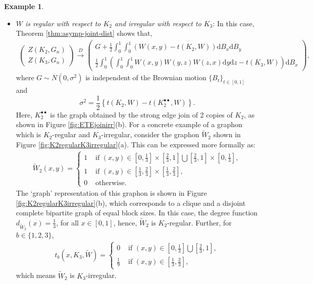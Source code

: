 \documentclass[11pt,reqno]{amsart}
\numberwithin{equation}{section}
\theoremstyle{definition}
\newtheorem{example}{Example}[section]
\begin{document}
\begin{example}
\begin{itemize}
\item[{\it Case} 2:] {\it $W$ is regular with respect to $K_2$ and  irregular with respect to $K_3$}: In this case, Theorem \ref{thm:asymp-joint-dist} shows that,
    \begin{align*}  
        \begin{pmatrix} 
        Z(K_2, G_n) \\ 
        Z(K_3, G_n)
        \end{pmatrix}
         \stackrel{D} \rightarrow \begin{pmatrix}
            G + \frac{1}{2} \int_{0}^{1}\int_{0}^{1} \left(W(x,y) - t(K_2,W)\right) \mathrm d B_{x}\mathrm d B_{y}\\
            \frac{1}{2}\int_{0}^{1}\left(\int_0^1\int_0^1W(x,y)W(y,z)W(z,x)\mathrm d y\mathrm d z - t(K_3,W)\right)\mathrm d B_{x}
        \end{pmatrix} , 
        \end{align*}
        where $G\sim N(0,\sigma^2)$ is independent of the Brownian motion $\{B_{t}\}_{t\in [0,1]}$ and
        $$\sigma^2 = \frac{1}{2}\left\{t\left(K_2,W\right) - t\left(K_2^{\bullet \bullet},W\right)\right\} . $$ 
        Here, $K_2^{\bullet \bullet}$ is the graph obtained by the strong edge join of 2 copies of $K_2$, as shown in Figure \ref{fig:ETEjoinirr}(b). For a concrete example of a graphon which is $K_2$-regular and $K_3$-irregular, consider the graphon $\tilde{W}_2$ shown in Figure \ref{fig:K2regularK3irregular}(a). This can be expressed more formally as: 
    \begin{align}\label{eq:K2regular}
        \tilde{W}_2(x, y)=
            \begin{cases}
            1 & \text{ if }(x,y)\in \left[0, \frac{1}{3}\right] \times  \left[\frac{2}{3}, 1 \right] \bigcup  \left[\frac{2}{3}, 1\right] \times  \left[0, \frac{1}{3} \right] , \\
            1 & \text{ if }(x,y)\in \left[\frac{1}{3}, \frac{2}{3}\right] \times  \left[\frac{1}{3}, \frac{2}{3}\right]   , \\ 
            0 & \text{ otherwise} .
            \end{cases}
    \end{align}
        The `graph' representation of this graphon is shown in Figure \ref{fig:K2regularK3irregular}(b), which corresponds to a clique and a disjoint complete bipartite graph of equal block sizes. In this case, the degree function $d_{\tilde{W}_2}(x) = \frac{1}{3}$, for all $x \in [0, 1]$, hence, $\tilde{W}_2$ is $K_2$-regular. Further, for $b \in \{ 1, 2, 3 \}$,   
                \begin{align*}
        t_b(x, K_3, \tilde{W} )=
            \begin{cases}
            0 & \text{ if }(x,y)\in \left[0, \frac{1}{3}\right]  \bigcup  \left[\frac{2}{3}, 1\right] , \\
            \frac{1}{9} & \text{ if }(x,y)\in \left[\frac{1}{3}, \frac{2}{3}\right] , 
            \end{cases} 
    \end{align*} 
    which means $\tilde{W}_2$ is $K_3$-irregular.
    

\end{itemize}
\end{example}
\end{document}
